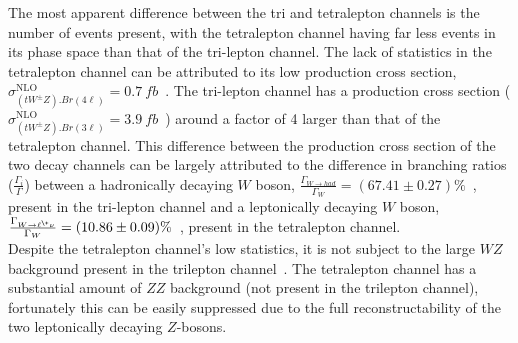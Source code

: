 The most apparent difference between the tri and tetralepton channels is the number of events present, with the tetralepton channel having far less events in its phase space than that of the tri-lepton channel. The lack of statistics in the tetralepton channel can be attributed to its low production cross section, $\sigma^{\text{NLO}}_{(tW^{\pm}Z).Br(4\ell)} = \SI{0.7}{fb}$~\cite{twz-theory-paper}. The tri-lepton channel has a production cross section ($\sigma^{\text{NLO}}_{(tW^{\pm}Z).Br(3\ell)} = \SI{3.9}{fb}$~\cite{twz-theory-paper}) around a factor of 4 larger than that of the tetralepton channel. This difference between the production cross section of the two decay channels can be largely attributed to the difference in branching ratios ($\frac{\Gamma_i}{\Gamma}$) between a hadronically decaying $W$ boson, $\frac{\Gamma_{W \rightarrow had}}{\Gamma_W} = (67.41 \pm 0.27) \%$~\cite{pdg}, present in the tri-lepton channel and a leptonically decaying $W$ boson, $\frac{\Gamma_{W \rightarrow \ell^{\+} \nu}}{\Gamma_W}  = (10.86 \pm 0.09) \%$~\cite{pdg}, present in the tetralepton channel.\\

Despite the tetralepton channel's low statistics, it is not subject to the large $WZ$ background present in the trilepton channel~\cite{ben-thesis}. The tetralepton channel has a substantial amount of $ZZ$ background (not present in the trilepton channel), fortunately this can be easily suppressed due to the full reconstructability of the two leptonically decaying $Z$-bosons.









